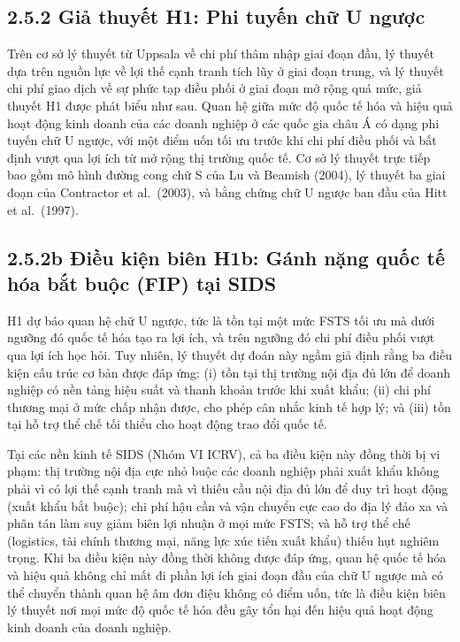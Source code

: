 \documentclass[
  a4paper,
  13pt]{extreport}
\begin{document}
\hypertarget{giux1ea3-thuyux1ebft-h1-phi-tuyux1ebfn-chux1eef-u-ngux1b0ux1ee3c}{%
\subsection{2.5.2 Giả thuyết H1: Phi tuyến chữ U
ngược}\label{giux1ea3-thuyux1ebft-h1-phi-tuyux1ebfn-chux1eef-u-ngux1b0ux1ee3c}}

Trên cơ sở lý thuyết từ Uppsala về chi phí thâm nhập giai đoạn đầu, lý
thuyết dựa trên nguồn lực về lợi thế cạnh tranh tích lũy ở giai đoạn
trung, và lý thuyết chi phí giao dịch về sự phức tạp điều phối ở giai
đoạn mở rộng quá mức, giả thuyết H1 được phát biểu như sau. Quan hệ giữa
mức độ quốc tế hóa và hiệu quả hoạt động kinh doanh của các doanh nghiệp
ở các quốc gia châu Á có dạng phi tuyến chữ U ngược, với một điểm uốn
tối ưu trước khi chi phí điều phối và bất định vượt qua lợi ích từ mở
rộng thị trường quốc tế. Cơ sở lý thuyết trực tiếp bao gồm mô hình đường
cong chữ S của Lu và Beamish (2004), lý thuyết ba giai đoạn của
Contractor et al.~(2003), và bằng chứng chữ U ngược ban đầu của Hitt et
al.~(1997).

\hypertarget{b-ux111iux1ec1u-kiux1ec7n-biuxean-h1b-guxe1nh-nux1eb7ng-quux1ed1c-tux1ebf-huxf3a-bux1eaft-buux1ed9c-fip-tux1ea1i-sids}{%
\subsection{2.5.2b Điều kiện biên H1b: Gánh nặng quốc tế hóa bắt buộc
(FIP) tại
SIDS}\label{b-ux111iux1ec1u-kiux1ec7n-biuxean-h1b-guxe1nh-nux1eb7ng-quux1ed1c-tux1ebf-huxf3a-bux1eaft-buux1ed9c-fip-tux1ea1i-sids}}

H1 dự báo quan hệ chữ U ngược, tức là tồn tại một mức FSTS tối ưu mà
dưới ngưỡng đó quốc tế hóa tạo ra lợi ích, và trên ngưỡng đó chi phí
điều phối vượt qua lợi ích học hỏi. Tuy nhiên, lý thuyết dự đoán này
ngầm giả định rằng ba điều kiện cấu trúc cơ bản được đáp ứng: (i) tồn
tại thị trường nội địa đủ lớn để doanh nghiệp có nền tảng hiệu suất và
thanh khoản trước khi xuất khẩu; (ii) chi phí thương mại ở mức chấp nhận
được, cho phép cân nhắc kinh tế hợp lý; và (iii) tồn tại hỗ trợ thể chế
tối thiểu cho hoạt động trao đổi quốc tế.

Tại các nền kinh tế SIDS (Nhóm VI ICRV), cả ba điều kiện này đồng thời
bị vi phạm: thị trường nội địa cực nhỏ buộc các doanh nghiệp phải xuất
khẩu không phải vì có lợi thế cạnh tranh mà vì thiếu cầu nội địa đủ lớn
để duy trì hoạt động (xuất khẩu bắt buộc); chi phí hậu cần và vận chuyển
cực cao do địa lý đảo xa và phân tán làm suy giảm biên lợi nhuận ở mọi
mức FSTS; và hỗ trợ thể chế (logistics, tài chính thương mại, năng lực
xúc tiến xuất khẩu) thiếu hụt nghiêm trọng. Khi ba điều kiện này đồng
thời không được đáp ứng, quan hệ quốc tế hóa và hiệu quả không chỉ mất
đi phần lợi ích giai đoạn đầu của chữ U ngược mà có thể chuyển thành
quan hệ âm đơn điệu không có điểm uốn, tức là điều kiện biên lý thuyết
nơi mọi mức độ quốc tế hóa đều gây tổn hại đến hiệu quả hoạt động kinh
doanh của doanh nghiệp.
\end{document}
